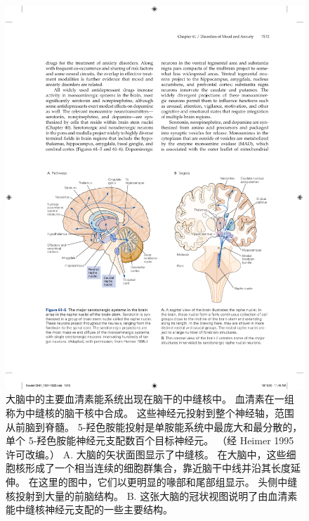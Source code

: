 \begin{figure}[htbp]
	\centering
	\includegraphics[width=0.95\linewidth]{chap61/fig_61_5}
	\caption{大脑中的主要血清素能系统出现在脑干的中缝核中。 血清素在一组称为中缝核的脑干核中合成。 这些神经元投射到整个神经轴，范围从前脑到脊髓。 5-羟色胺能投射是单胺能系统中最庞大和最分散的，单个 5-羟色胺能神经元支配数百个目标神经元。 （经 Heimer 1995 许可改编。） A. 大脑的矢状面图显示了中缝核。 在大脑中，这些细胞核形成了一个相当连续的细胞群集合，靠近脑干中线并沿其长度延伸。 在这里的图中，它们以更明显的喙部和尾部组显示。 头侧中缝核投射到大量的前脑结构。 B. 这张大脑的冠状视图说明了由血清素能中缝核神经元支配的一些主要结构。}
	\label{fig:61_5}
\end{figure}

